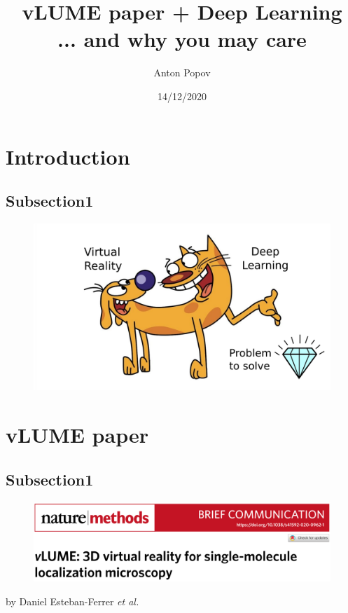 \documentclass[10pt, xcolor=x11names,compress]{beamer}
\title{vLUME paper + Deep Learning\\... and why you may care}
\author{Anton Popov}
\institute{ViRe / IJC}
\date{14/12/2020}
\begin{document}
\frame{\titlepage}

\section{Introduction}

\subsection{Subsection1}
\begin{frame}
	\begin{figure}
		\centering
		\includegraphics[height=.75\textheight]{images/cat-dog-gem.png}
	\end{figure}
\end{frame}


\section{vLUME paper}

\subsection{Subsection1}
\begin{frame}
	\begin{figure}
		\centering
		\includegraphics[height=.35\textheight]{images/paper.png}
	\end{figure}
by Daniel Esteban-Ferrer \textit{et al.}
\end{frame}
\end{document}
